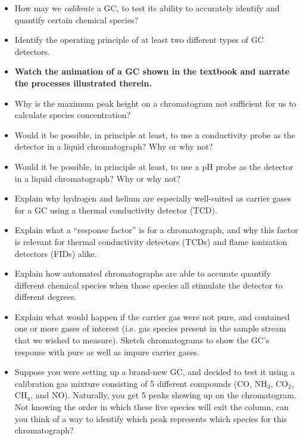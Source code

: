 \begin{itemize}
\item{} How may we {\it calibrate} a GC, to test its ability to accurately identify and quantify certain chemical species?
\item{} Identify the operating principle of at least two different types of GC detectors.
\item{} {\bf Watch the animation of a GC shown in the textbook and narrate the processes illustrated therein.}
\item{} Why is the maximum peak height on a chromatogram not sufficient for us to calculate species concentration?
\item{} Would it be possible, in principle at least, to use a conductivity probe as the detector in a liquid chromatograph?  Why or why not?
\item{} Would it be possible, in principle at least, to use a pH probe as the detector in a liquid chromatograph?  Why or why not?
\item{} Explain why hydrogen and helium are especially well-suited as carrier gases for a GC using a thermal conductivity detector (TCD).
\item{} Explain what a ``response factor'' is for a chromatograph, and why this factor is relevant for thermal conductivity detectors (TCDs) and flame ionization detectors (FIDs) alike.
\item{} Explain how automated chromatographs are able to accurate quantify different chemical species when those species all stimulate the detector to different degrees.
\item{} Explain what would happen if the carrier gas were not pure, and contained one or more gases of interest (i.e. gas species present in the sample stream that we wished to measure).  Sketch chromatograms to show the GC's response with pure as well as impure carrier gases.
\item{} Suppose you were setting up a brand-new GC, and decided to test it using a calibration gas mixture consisting of 5 different compounds (CO, NH$_{3}$, CO$_{2}$, CH$_{4}$, and NO).  Naturally, you get 5 peaks showing up on the chromatogram.  Not knowing the order in which these five species will exit the column, can you think of a way to identify which peak represents which species for this chromatograph?
\end{itemize}



